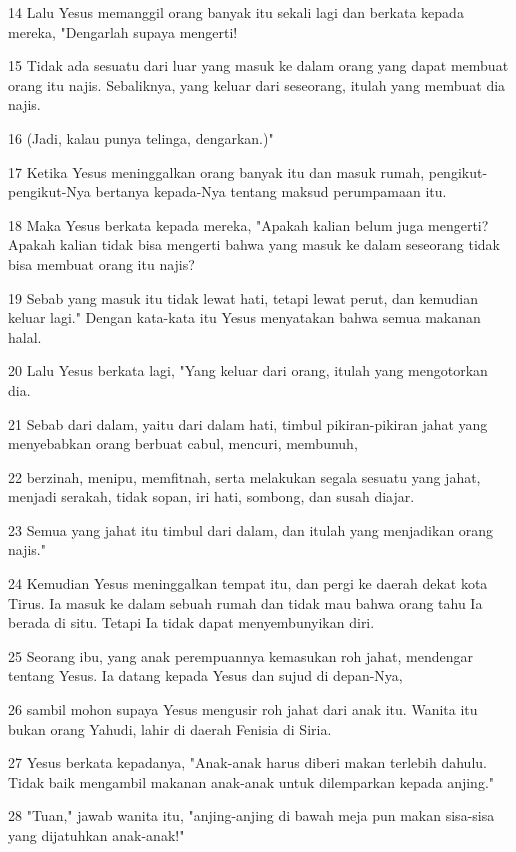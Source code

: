 \par 14 Lalu Yesus memanggil orang banyak itu sekali lagi dan berkata kepada mereka, "Dengarlah supaya mengerti!
\par 15 Tidak ada sesuatu dari luar yang masuk ke dalam orang yang dapat membuat orang itu najis. Sebaliknya, yang keluar dari seseorang, itulah yang membuat dia najis.
\par 16 (Jadi, kalau punya telinga, dengarkan.)"
\par 17 Ketika Yesus meninggalkan orang banyak itu dan masuk rumah, pengikut-pengikut-Nya bertanya kepada-Nya tentang maksud perumpamaan itu.
\par 18 Maka Yesus berkata kepada mereka, "Apakah kalian belum juga mengerti? Apakah kalian tidak bisa mengerti bahwa yang masuk ke dalam seseorang tidak bisa membuat orang itu najis?
\par 19 Sebab yang masuk itu tidak lewat hati, tetapi lewat perut, dan kemudian keluar lagi." Dengan kata-kata itu Yesus menyatakan bahwa semua makanan halal.
\par 20 Lalu Yesus berkata lagi, "Yang keluar dari orang, itulah yang mengotorkan dia.
\par 21 Sebab dari dalam, yaitu dari dalam hati, timbul pikiran-pikiran jahat yang menyebabkan orang berbuat cabul, mencuri, membunuh,
\par 22 berzinah, menipu, memfitnah, serta melakukan segala sesuatu yang jahat, menjadi serakah, tidak sopan, iri hati, sombong, dan susah diajar.
\par 23 Semua yang jahat itu timbul dari dalam, dan itulah yang menjadikan orang najis."
\par 24 Kemudian Yesus meninggalkan tempat itu, dan pergi ke daerah dekat kota Tirus. Ia masuk ke dalam sebuah rumah dan tidak mau bahwa orang tahu Ia berada di situ. Tetapi Ia tidak dapat menyembunyikan diri.
\par 25 Seorang ibu, yang anak perempuannya kemasukan roh jahat, mendengar tentang Yesus. Ia datang kepada Yesus dan sujud di depan-Nya,
\par 26 sambil mohon supaya Yesus mengusir roh jahat dari anak itu. Wanita itu bukan orang Yahudi, lahir di daerah Fenisia di Siria.
\par 27 Yesus berkata kepadanya, "Anak-anak harus diberi makan terlebih dahulu. Tidak baik mengambil makanan anak-anak untuk dilemparkan kepada anjing."
\par 28 "Tuan," jawab wanita itu, "anjing-anjing di bawah meja pun makan sisa-sisa yang dijatuhkan anak-anak!"
